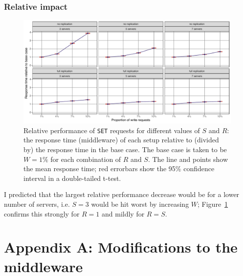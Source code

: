 \documentclass[11pt]{article}
\newcommand{\set}[0]{\texttt{SET}}
\begin{document}
\subsubsection{Relative impact}

\begin{figure}[h]
\centering
\includegraphics[width=\textwidth]{../results/writes/graphs/relative_performance_set.pdf}
\caption{Relative performance of \set{} requests for different values of $S$ and $R$: the response time (middleware) of each setup relative to (divided by) the response time in the base case. The base case is taken to be $W=1\%$ for each combination of $R$ and $S$.
The line and points show the mean response time; red errorbars show the 95\% confidence interval in a double-tailed t-test.}
\label{fig:exp3:res:relative:set}
\end{figure}

I predicted that the largest relative performance decrease would be for a lower number of servers, i.e. $S=3$ would be hit worst by increasing $W$; Figure~\ref{fig:exp3:res:relative:set} confirms this strongly for $R=1$ and mildly for $R=S$.




\clearpage

\section*{Appendix A: Modifications to the middleware}
\label{sec:appa}
\end{document}
